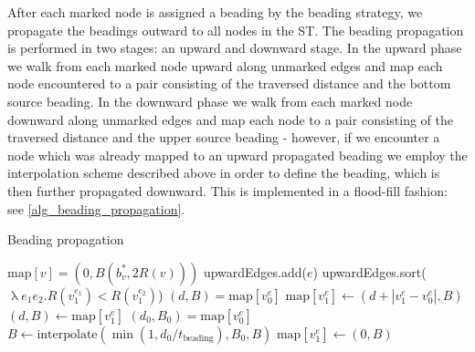 After each marked node is assigned a beading by the beading strategy, we propagate the beadings outward to all nodes in the ST.
The beading propagation is performed in two stages: an upward and downward stage.
In the upward phase we walk from each marked node upward along unmarked edges and map each node encountered to a pair consisting of the traversed distance and the bottom source beading.
In the downward phase we walk from each marked node downward along unmarked edges and map each node to a pair consisting of the traversed distance and the upper source beading -
however, if we encounter a node which was already mapped to an upward propagated beading we employ the interpolation scheme described above in order to define the beading, which is then further propagated downward.
This is implemented in a flood-fill fashion: see \cref{alg_beading_propagation}.

\begin{algorithm}
\caption{Beading propagation}
\label{alg_beading_propagation}
\begin{algorithmic}
	 $\text{map}[v] = (0, B(b^*_v, 2 R(v)))$ \EndIf
\EndFor
{}
		upwardEdges.add($e$)
	\EndIf
\EndFor
\State upwardEdges.sort($\uplambda e_1 e_2 . R(v_1^{e_1}) < R(v_1^{e_2})$) 
 
    		\State $(d, B) = \text{map}[v_0^e]$
    		\State $\text{map}[v_1^e] \leftarrow (d + |v_1^e - v_0^e|, B)$
	\EndIf
\EndFor
{} 
    		\State $(d, B) \leftarrow \text{map}[v_1^e]$
    			\State $(d_0, B_0) = \text{map}[v_0^e]$
    			\State $B \leftarrow \text{interpolate}(\min(1, d_0 /  t_\text{beading}), B_0, B)$
    		\EndIf
    		\State $\text{map}[v_1^e] \leftarrow (0, B)$
	\EndIf
\EndFor
\end{algorithmic}
\end{algorithm}
















